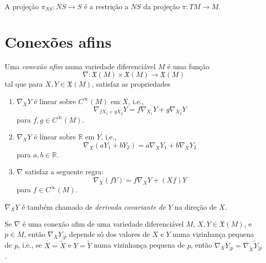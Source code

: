 \begin{definicao}
	A projeção $\pi_{NS}: NS \rightarrow S$ é a restrição a $NS$ da projeção $\pi: TM \rightarrow M$.
\end{definicao}

\section{Conexões afins}

\begin{definicao}
	Uma \emph{conexão afim} numa variedade diferenciável $M$ é uma função
	\begin{equation*}
		\nabla: \mathfrak{X}(M) \times \mathfrak{X}(M) \rightarrow \mathfrak{X}(M)
	\end{equation*}
	tal que para $X,Y \in \mathfrak{X}(M)$, satisfaz as propriedades
	\begin{enumerate}
		\item $\nabla_X Y$ é linear sobre $C^\infty (M)$ em $X$, i.e.,
		\begin{equation*}
			\nabla_{f X_1 + g X_2} Y = f \nabla_{X_1} Y + g \nabla_{X_2} Y
		\end{equation*}
		para $f,g \in C^{\infty} (M)$.
		
		\item $\nabla_X Y$ é linear sobre $\mathbb{R}$ em $Y$, i.e.,
		\begin{equation*}
			\nabla_X (a Y_1 + b Y_2) = a \nabla_X Y_1 + b \nabla_X Y_2
		\end{equation*}
		para $a,b \in \mathbb{R}$.
		
		\item $\nabla$ satisfaz a seguente regra:
		\begin{equation*}
			\nabla_X (f Y) = f \nabla_X Y + (X f) Y
		\end{equation*}
		para $f \in C^{\infty}(M)$.
	\end{enumerate}
\end{definicao}

\begin{observacao}
	$\nabla_X Y$ é também chamado de \emph{derivada covariante de} $Y$ na direção de $X$.
\end{observacao}

\begin{lema}\label{boa_definicao_conexao_1}
	Se $\nabla$ é uma conexão afim de uma variedade diferenciável $M$, $X,Y \in \mathfrak{X}(M)$, e $p \in M$, então $\nabla_X Y_{|p}$ depende só dos valores de $X$ e $Y$ numa vizinhança pequena de $p$, i.e., se $X = \tilde{X}$ e $Y = \tilde{Y}$ numa vizinhança pequena de $p$, então $\nabla_X Y_{|p} = \nabla_{\tilde{X}} \tilde{Y}_{|p}$.
\end{lema}

